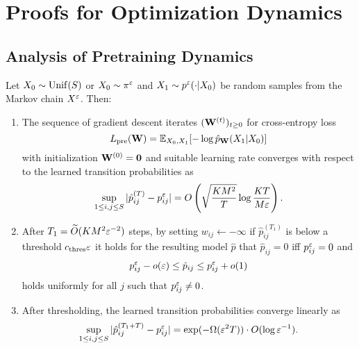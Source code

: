 \section{Proofs for Optimization Dynamics}\label{app:opt}

\subsection{Analysis of Pretraining Dynamics}

\begin{thm}\label{thm:prefull}
Let $X_0\sim\operatorname{Unif}(S)$ or $X_0\sim\pi^\varepsilon$ and $X_1\sim p^\varepsilon(\cdot|X_0)$ be random samples from the Markov chain $X^\varepsilon$. Then:
\begin{enumerate}
\item\label{item:pt1} The sequence of gradient descent iterates $(\mathbf{W}^{(t)})_{t\ge 0}$ for cross-entropy loss
\begin{equation*}
L_{\operatorname{pre}}(\mathbf{W}) = \mathbb{E}_{X_0,X_1}[-\log\hat{p}_{\mathbf{W}}(X_1|X_0)]
\end{equation*}
with initialization $\mathbf{W}^{(0)}=\boldsymbol{0}$ and suitable learning rate converges with respect to the learned transition probabilities as
\begin{equation}\label{eq:prerate}
\sup_{1\le i,j\le S} |\hat{p}_{ij}^{(T)} - p_{ij}^\varepsilon| = O\left(\sqrt{\frac{KM^2}{T}}\log \frac{KT}{M\varepsilon} \right).
\end{equation}
\item\label{item:pt2} After $T_1 = \widetilde{O}(KM^2\varepsilon^{-2})$ steps, by setting $w_{ij}\gets -\infty$ if $\hat{p}_{ij}^{(T_1)}$ is below a threshold $c_\mathrm{thres}\varepsilon$ it holds for the resulting model $\hat{p}$ that $\hat{p}_{ij} = 0$ iff $p_{ij}^\varepsilon = 0$ and
\begin{equation}\label{eq:prethres}
p_{ij}^\varepsilon - o(\varepsilon) \le \hat{p}_{ij} \le p_{ij}^\varepsilon + o(1)
\end{equation}
holds uniformly for all $j$ such that $p_{ij}^\varepsilon\neq 0$.
\item\label{item:pt3} After thresholding, the learned transition probabilities converge linearly as
\begin{equation}\label{eq:prerate2}
\sup_{1\le i,j\le S} |\hat{p}_{ij}^{(T_1+T)} - p_{ij}^\varepsilon| = \exp(-\Omega(\varepsilon^2T))\cdot O(\log\varepsilon^{-1}).
\end{equation}
\end{enumerate}
\end{thm}

